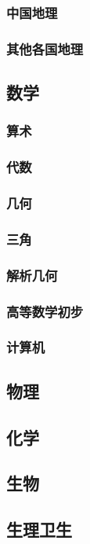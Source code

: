 \documentclass[UTF8]{../../ApplicationUniverse}
\begin{document}
        \subsubsection{中国地理}
        \subsubsection{其他各国地理}
 
    \subsection{数学} 
        \subsubsection{算术}
        \subsubsection{代数}
        \subsubsection{几何}
        \subsubsection{三角}
        \subsubsection{解析几何}
        \subsubsection{高等数学初步}
        \subsubsection{计算机}
    \subsection{物理}
    \subsection{化学}
    \subsection{生物}
    \subsection{生理卫生}
\end{document}
